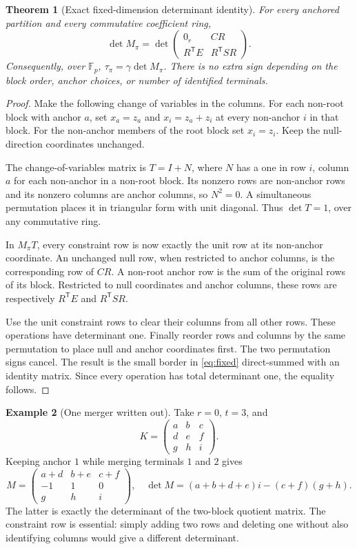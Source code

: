 \documentclass[11pt,letterpaper]{article}
\newtheorem{theorem}{Theorem}[section]
\theoremstyle{definition}\newtheorem{definition}[theorem]{Definition}
\newtheorem{example}[theorem]{Example}
\theoremstyle{remark}\newtheorem{remark}[theorem]{Remark}
\newcommand{\F}{\mathbb F}
\newcommand{\trans}{^{\mathsf T}}
\begin{document}
\begin{theorem}[Exact fixed-dimension determinant identity]
\label{thm:fixed}
For every anchored partition and every commutative coefficient ring,
\begin{equation}
 \det M_\pi=
 \det\begin{pmatrix}0_r&CR\\R\trans E&R\trans SR\end{pmatrix}.
 \label{eq:fixed}
\end{equation}
Consequently, over $\F_p$, $\tau_\pi=\gamma\det M_\pi$. There is no extra sign depending on the block order, anchor choices, or number of identified terminals.
\end{theorem}
\begin{proof}
Make the following change of variables in the columns. For each non-root block with anchor $a$, set $x_a=z_a$ and $x_i=z_a+z_i$ at every non-anchor $i$ in that block. For the non-anchor members of the root block set $x_i=z_i$. Keep the null-direction coordinates unchanged.

The change-of-variables matrix is $T=I+N$, where $N$ has a one in row $i$, column $a$ for each non-anchor in a non-root block. Its nonzero rows are non-anchor rows and its nonzero columns are anchor columns, so $N^2=0$. A simultaneous permutation places it in triangular form with unit diagonal. Thus $\det T=1$, over any commutative ring.

In $M_\pi T$, every constraint row is now exactly the unit row at its non-anchor coordinate. An unchanged null row, when restricted to anchor columns, is the corresponding row of $CR$. A non-root anchor row is the sum of the original rows of its block. Restricted to null coordinates and anchor columns, these rows are respectively $R\trans E$ and $R\trans SR$.

Use the unit constraint rows to clear their columns from all other rows. These operations have determinant one. Finally reorder rows and columns by the same permutation to place null and anchor coordinates first. The two permutation signs cancel. The result is the small border in \eqref{eq:fixed} direct-summed with an identity matrix. Since every operation has total determinant one, the equality follows.
\end{proof}

\begin{example}[One merger written out]
Take $r=0$, $t=3$, and
\[
 K=\begin{pmatrix}a&b&c\\d&e&f\\g&h&i\end{pmatrix}.
\]
Keeping anchor $1$ while merging terminals $1$ and $2$ gives
\[
 M=\begin{pmatrix}a+d&b+e&c+f\\-1&1&0\\g&h&i\end{pmatrix},
 \quad
 \det M=(a+b+d+e)i-(c+f)(g+h).
\]
The latter is exactly the determinant of the two-block quotient matrix. The constraint row is essential: simply adding two rows and deleting one without also identifying columns would give a different determinant.
\end{example}
\end{document}
